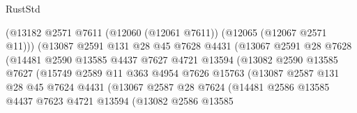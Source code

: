 \begin{lexlean}{RustStd}
\begin{coremodule}
                                (@13182
                                  @2571
                                  @7611
                                  (@12060 (@12061 @7611))
                                  (@12065 (@12067 @2571 @11)))
                                (@13087
                                  @2591
                                  @131
                                  @28
                                  @45
                                  @7628
                                  @4431
                                  (@13067
                                    @2591
                                    @28
                                    @7628
                                    (@14481
                                      @2590
                                      @13585
                                      @4437
                                      @7627
                                      @4721
                                      @13594
                                      (@13082
                                        @2590
                                        @13585
                                        @7627
                                        (@15749
                                          @2589
                                          @11
                                          @363
                                          @4954
                                          @7626
                                          @15763
                                          (@13087
                                            @2587
                                            @131
                                            @28
                                            @45
                                            @7624
                                            @4431
                                            (@13067
                                              @2587
                                              @28
                                              @7624
                                              (@14481
                                                @2586
                                                @13585
                                                @4437
                                                @7623
                                                @4721
                                                @13594
                                                (@13082
                                                  @2586
                                                  @13585

\end{coremodule}
\end{lexlean}
